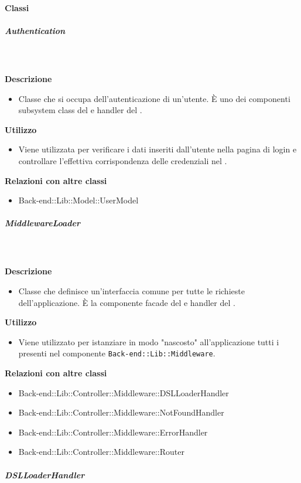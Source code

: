 		\paragraph{Classi}
			\subparagraph{Authentication}
				
				\textbf{\\ \\ Descrizione} 
					\begin{itemize}
						\item[] Classe che si occupa dell'autenticazione di un'utente. È uno dei componenti subsystem class del   e handler del  .
					\end{itemize}      
				\textbf{Utilizzo}  
					\begin{itemize}
						\item[] Viene utilizzata per verificare i dati inseriti dall'utente nella pagina di login e controllare l'effettiva corrispondenza delle credenziali nel .
					\end{itemize}
					\textbf{Relazioni con altre classi}
					\begin{itemize}
							\item{Back-end::Lib::Model::UserModel}
					\end{itemize}
			\subparagraph{MiddlewareLoader}
				
				\textbf{\\ \\ Descrizione} 
					\begin{itemize}
						\item[] Classe che definisce un'interfaccia comune per tutte le richieste dell'applicazione. È la componente facade del   e handler del  .
					\end{itemize}      
				\textbf{Utilizzo}  
					\begin{itemize}
						\item[] Viene utilizzato per istanziare in modo "nascosto" all'applicazione tutti i  presenti nel componente \texttt{Back-end::Lib::Middleware}.
					\end{itemize}
					\textbf{Relazioni con altre classi}
					\begin{itemize}
							\item{Back-end::Lib::Controller::Middleware::DSLLoaderHandler}
							\item{Back-end::Lib::Controller::Middleware::NotFoundHandler}
							\item{Back-end::Lib::Controller::Middleware::ErrorHandler}
							\item{Back-end::Lib::Controller::Middleware::Router}
					\end{itemize}
			\subparagraph{DSLLoaderHandler}
				
